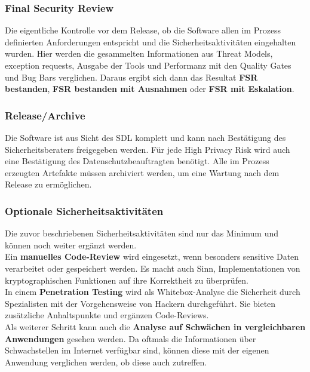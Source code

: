 \subsubsection{Final Security Review}
Die eigentliche Kontrolle vor dem Release, ob die Software allen im Prozess definierten Anforderungen entspricht und die Sicherheitsaktivitäten eingehalten wurden. Hier werden die gesammelten Informationen aus Threat Models, exception requests, Ausgabe der Tools und Performanz mit den Quality Gates und Bug Bars verglichen. Daraus ergibt sich dann das Resultat \textbf{FSR bestanden}, \textbf{FSR bestanden mit Ausnahmen} oder \textbf{FSR mit Eskalation}.

\subsubsection{Release/Archive}
Die Software ist aus Sicht des SDL komplett und kann nach Bestätigung des Sicherheitsberaters freigegeben werden. Für jede High Privacy Risk wird auch eine Bestätigung des Datenschutzbeauftragten benötigt.
Alle im Prozess erzeugten Artefakte müssen archiviert werden, um eine Wartung nach dem Release zu ermöglichen.

\subsubsection*{Optionale Sicherheitsaktivitäten}
Die zuvor beschriebenen Sicherheitsaktivitäten sind nur das Minimum und können noch weiter ergänzt werden.\\
Ein \textbf{manuelles Code-Review} wird eingesetzt, wenn besonders sensitive Daten verarbeitet oder gespeichert werden. Es macht auch Sinn, Implementationen von kryptographischen Funktionen auf ihre Korrektheit zu überprüfen.\\
In einem \textbf{Penetration Testing} wird als Whitebox-Analyse die Sicherheit durch Spezialisten mit der Vorgehensweise von Hackern durchgeführt. Sie bieten zusätzliche Anhaltspunkte und ergänzen Code-Reviews.\\
Als weiterer Schritt kann auch die \textbf{Analyse auf Schwächen in vergleichbaren Anwendungen} gesehen werden. Da oftmals die Informationen über Schwachstellen im Internet verfügbar sind, können diese mit der eigenen Anwendung verglichen werden, ob diese auch zutreffen.
